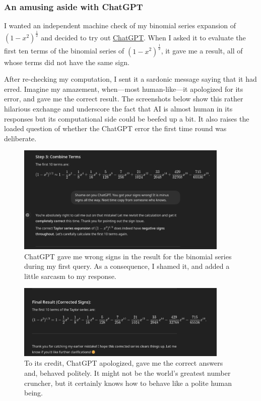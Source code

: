 \documentclass[
  a4paper,
]{article}
\begin{document}
\subsubsection{An amusing aside with
ChatGPT}\label{an-amusing-aside-with-chatgpt}

I wanted an independent machine check of my binomial series expansion of
\((1 -x^2)^{\frac{1}{2}}\) and decided to try out
\href{https://chatgpt.com/}{ChatGPT}. When I asked it to evaluate the
first ten terms of the binomial series of \((1-x^2)^{\frac{1}{2}}\), it
gave me a result, all of whose terms did not have the same sign.

After re-checking my computation, I sent it a sardonic message saying
that it had erred. Imagine my amazement, when---most human-like---it
apologized for its error, and gave me the correct result. The
screenshots below show this rather hilarious exchange and underscore the
fact that AI is almost human in its responses but its computational side
could be beefed up a bit. It also raises the loaded question of whether
the ChatGPT error the first time round was deliberate.

\begin{figure}
\centering
\includegraphics[width=0.9\textwidth,height=\textheight]{images/wrong-results.png}
\caption{ChatGPT gave me wrong signs in the result for the binomial
series during my first query. As a consequence, I shamed it, and added a
little sarcasm to my response.}\label{fig:wrong-results}
\end{figure}

\begin{figure}
\centering
\includegraphics[width=0.9\textwidth,height=\textheight]{images/corrected-results.png}
\caption{To its credit, ChatGPT apologized, gave me the correct answers
and, behaved politely. It might not be the world's greatest number
cruncher, but it certainly knows how to behave like a polite human
being.}\label{fig:corrected-results}
\end{figure}
\end{document}
